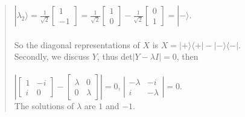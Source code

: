 \documentclass[UTF8]{ctexart}
\begin{document}
\begin{quote}
	$|\lambda_{2}\rangle=\frac{1}{\sqrt{2}}\begin{bmatrix}1\\-1\end{bmatrix}
	=\frac{1}{\sqrt{2}}\begin{bmatrix}1\\0\end{bmatrix}-\frac{1}{\sqrt{2}}\begin{bmatrix}0\\1\end{bmatrix}
	=|-\rangle$.
	\\ \\
	So the diagonal representations of $X$ is
	$X=|+\rangle\langle+|-|-\rangle\langle-|.$ \\ 
	Secondly, we discuss $Y$, thus det$|Y-\lambda I|=0$, then\\  \\
	$\left| \begin{bmatrix}1&-i\\i& 0\end{bmatrix}-\begin{bmatrix}\lambda&0\\0&\lambda\end{bmatrix} \right |=0$,
	$\left|\begin{array}{cccc} -\lambda&-i\\i&-\lambda \end{array}\right| =0. $ \\

	The solutions of $\lambda$  are $1$ and $-1$.
	

\end{quote}
\end{document}
